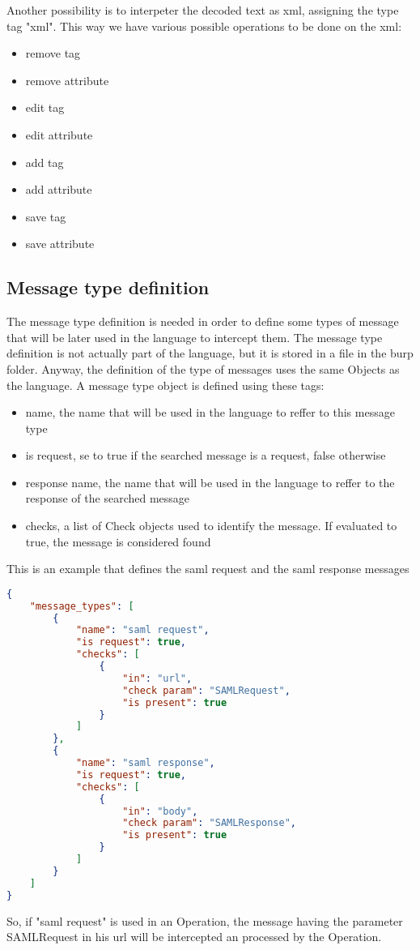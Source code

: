 Another possibility is to interpeter the decoded text as xml, assigning the type tag "xml".
This way we have various possible operations to be done on the xml:
\begin{itemize}
    \item remove tag
    \item remove attribute
    \item edit tag
    \item edit attribute
    \item add tag
    \item add attribute 
    \item save tag
    \item save attribute
\end{itemize}

\subsection{Message type definition}
The message type definition is needed in order to define some types of message that will be later used in the language to intercept them.
The message type definition is not actually part of the language, but it is stored in a file in the burp folder. Anyway, the definition of the type of messages uses the same Objects as the language.
A message type object is defined using these tags:
\begin{itemize}
    \item name, the name that will be used in the language to reffer to this message type
    \item is request, se to true if the searched message is a request, false otherwise
    \item response name, the name that will be used in the language to reffer to the response of the searched message
    \item checks, a list of Check objects used to identify the message. If evaluated to true, the message is considered found
\end{itemize}
This is an example that defines the saml request and the saml response messages

\begin{lstlisting}[language=json]
{
    "message_types": [
        {
            "name": "saml request",
            "is request": true,
            "checks": [
                {
                    "in": "url",
                    "check param": "SAMLRequest",
                    "is present": true
                }
            ]
        },
        {
            "name": "saml response",
            "is request": true,
            "checks": [
                {
                    "in": "body",
                    "check param": "SAMLResponse",
                    "is present": true
                }
            ]
        }
    ]
}
\end{lstlisting}
So, if "saml request" is used in an Operation, the message having the parameter SAMLRequest in his url will be intercepted an processed by the Operation.


